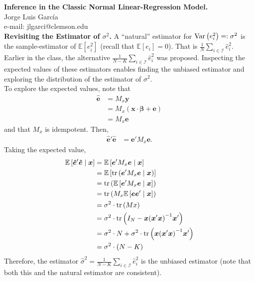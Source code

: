 
\let\counterwithout\relax
\let\counterwithin\relax
{}



\noindent \textbf{Inference in the Classic Normal Linear-Regression Model.}\\
\noindent Jorge Luis García \\
\noindent e-mail: jlgarci@clemson.edu\\

\noindent \textbf{Revisiting the Estimator of $\sigma^2$.} A ``natural'' estimator for $\operatorname{Var} \left( e_i^2 \right) =: \sigma^2$ is the sample-estimator of $\mathbb{E} \left[ e_i^2 \right]$ (recall that $\mathbb{E} \left[ e_i \right] = 0$). That is $\frac{1}{N} \sum \limits _{i \in \mathcal{I}} \hat{e}_i^2 $. Earlier in the class, the alternative $\frac{1}{N-K} \sum \limits _{i \in \mathcal{I}} \hat{e}_i^2 $ was proposed. Inspecting the expected values of these estimators enables finding the unbiased estimator and exploring the distribution of the estimator of $\sigma^2$.\\ 

\noindent To explore the expected values, note that
\begin{align}
	\bm{\hat{e}} & = M_x \bm{y} \nonumber \\ 
				  & = M_x \left( \bm{x} \cdot \bm{\beta} + \bm{e} \right) \nonumber \\ 
				  & = M_x \bm{e}
\end{align}
\noindent and that $M_x$ is idempotent. Then, 
\begin{align}
	\bm{\hat{e}}' \bm{\hat{e}} & = \bm{e}' M_x \bm{e}. 
\end{align}
\noindent Taking the expected value, 
\begin{align}
	\mathbb{E} \left[ \bm{\hat{e}}' \bm{\hat{e}} \mid \bm{x} \right] & = \mathbb{E} \left[ \bm{e}' M_x \bm{e} \mid \bm{x} \right] \nonumber \\
			& = \mathbb{E} \left[ \operatorname{tr} \left( \bm{e}' M_x \bm{e} \mid \bm{x} \right) \right] \nonumber \\
			& = \operatorname{tr} \left( \mathbb{E} \left[ \bm{e}' M_x \bm{e} \mid \bm{x}\right] \right) \nonumber \\ 
			& = \operatorname{tr} \left( M_x \mathbb{E} \left[ \bm{e} \bm{e}' \mid \bm{x} \right] \right) \nonumber \\ 
			& = \sigma^2 \cdot \operatorname{tr} \left ( Mx \right)  \nonumber \\
			& = \sigma^2 \cdot \operatorname{tr} \left( I_N - \bm{x} { \left( \bm{x}' \bm{x} \right) }^{-1} \bm{x}' \right) \nonumber \\
			& = \sigma^2 \cdot N + \sigma^2 \cdot \operatorname{tr} \left( \bm{x} { \left( \bm{x}' \bm{x} \right) }^{-1} \bm{x}' \right) \nonumber \\ 
			& = \sigma^2 \cdot \left( N - K \right)
\end{align}
\noindent Therefore, the estimator $\hat{\sigma}^2 = \frac{1}{N-K} \sum \limits _{i \in \mathcal{I}} \hat{e}_i^2$ is the unbiased estimator (note that both this and the natural estimator are consistent). 

